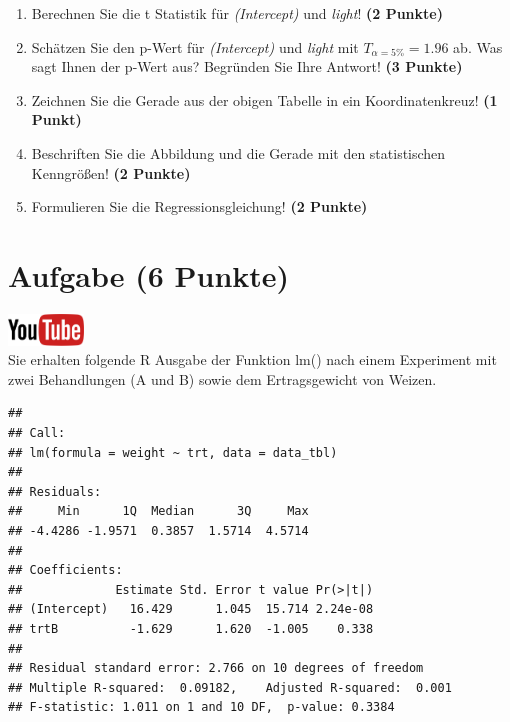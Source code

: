 \documentclass[a4paper, 10pt]{scrartcl}\usepackage[]{graphicx}\usepackage[]{xcolor}
\makeatletter
\newenvironment{kframe}{%
 \def\at@end@of@kframe{}%
 \ifinner\ifhmode%
  \def\at@end@of@kframe{\end{minipage}}%
  \begin{minipage}{\columnwidth}%
 \fi\fi%
 \def\FrameCommand##1{\hskip\@totalleftmargin \hskip-\fboxsep
 \colorbox{shadecolor}{##1}\hskip-\fboxsep
     \hskip-\linewidth \hskip-\@totalleftmargin \hskip\columnwidth}%
 \MakeFramed {\advance\hsize-\width
   \@totalleftmargin\z@ \linewidth\hsize
   \@setminipage}}%
 {\par\unskip\endMakeFramed%
 \at@end@of@kframe}
\newenvironment{knitrout}{}{} %
\makeatother
\begin{document}
\begin{enumerate}
\item Berechnen Sie die t Statistik f{\"u}r \textit{(Intercept)} und
  \textit{light}! \textbf{(2 Punkte)}
\item Sch{\"a}tzen Sie den p-Wert f{\"u}r \textit{(Intercept)} und
  \textit{light} mit $T_{\alpha = 5\%} = 1.96$ ab. Was sagt Ihnen der p-Wert aus?
  Begr{\"u}nden Sie Ihre Antwort! \textbf{(3 Punkte)}
\item Zeichnen Sie die Gerade aus der obigen Tabelle in ein Koordinatenkreuz! \textbf{(1 Punkt)}
\item Beschriften Sie die Abbildung und die Gerade mit den statistischen
  Kenngr{\"o}{\ss}en! \textbf{(2 Punkte)}
\item Formulieren Sie die Regressionsgleichung! \textbf{(2 Punkte)}
\end{enumerate} 
\clearpage

\section{Aufgabe \hfill (6 Punkte)}

\hfill\href{https://youtu.be/tNNzcndrpSk}{\includegraphics[width =
  2cm]{img/youtube}}\\[1Ex]

Sie erhalten folgende R Ausgabe der Funktion lm() nach einem Experiment mit
zwei Behandlungen (A und B) sowie dem Ertragsgewicht von Weizen.

\begin{knitrout}
\color{fgcolor}\begin{kframe}
\begin{verbatim}
## 
## Call:
## lm(formula = weight ~ trt, data = data_tbl)
## 
## Residuals:
##     Min      1Q  Median      3Q     Max 
## -4.4286 -1.9571  0.3857  1.5714  4.5714 
## 
## Coefficients:
##             Estimate Std. Error t value Pr(>|t|)
## (Intercept)   16.429      1.045  15.714 2.24e-08
## trtB          -1.629      1.620  -1.005    0.338
## 
## Residual standard error: 2.766 on 10 degrees of freedom
## Multiple R-squared:  0.09182,	Adjusted R-squared:  0.001 
## F-statistic: 1.011 on 1 and 10 DF,  p-value: 0.3384
\end{verbatim}
\end{kframe}
\end{knitrout}
\end{document}
